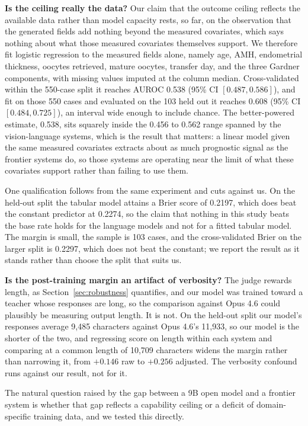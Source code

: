 \textbf{Is the ceiling really the data?} Our claim that the outcome ceiling
reflects the available data rather than model capacity rests, so far, on the
observation that the generated fields add nothing beyond the measured covariates,
which says nothing about what those measured covariates themselves support. We therefore fit logistic regression to the
measured fields alone, namely age, AMH, endometrial thickness, oocytes retrieved,
mature oocytes, transfer day, and the three Gardner components, with missing
values imputed at the column median. Cross-validated within the 550-case split it
reaches AUROC 0.538 (95\% CI $[0.487, 0.586]$), and fit on those 550 cases and
evaluated on the 103 held out it reaches 0.608 (95\% CI $[0.484, 0.725]$), an
interval wide enough to include chance. The better-powered estimate, 0.538, sits
squarely inside the 0.456 to 0.562 range spanned by the vision-language systems,
which is the result that matters: a linear model given the same measured
covariates extracts about as much prognostic signal as the frontier systems do,
so those systems are operating near the limit of what these covariates support
rather than failing to use them.

One qualification follows from the same experiment and cuts against us. On the
held-out split the tabular model attains a Brier score of 0.2197, which does beat
the constant predictor at 0.2274, so the claim that nothing in this study beats
the base rate holds for the language models and not for a fitted tabular model.
The margin is small, the sample is 103 cases, and the cross-validated Brier on
the larger split is 0.2297, which does not beat the constant; we report the
result as it stands rather than choose the split that suits us.

\textbf{Is the post-training margin an artifact of verbosity?} The judge rewards
length, as Section~\ref{sec:robustness} quantifies, and our model was trained
toward a teacher whose responses are long, so the comparison against Opus 4.6
could plausibly be measuring output length. It is not. On the held-out split our
model's responses average 9,485 characters against Opus 4.6's 11,933, so our
model is the shorter of the two, and regressing score on length within each
system and comparing at a common length of 10,709 characters widens the margin
rather than narrowing it, from $+0.146$ raw to $+0.256$ adjusted. The verbosity
confound runs against our result, not for it.

The natural question raised by the gap between a 9B open model and a frontier
system is whether that gap reflects a capability ceiling or a deficit of
domain-specific training data, and we tested this directly.

